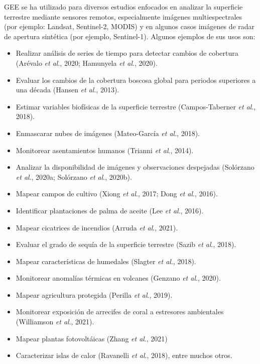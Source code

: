 \documentclass[
  12pt,
  letterpaper,
  twoside]{book}
\providecommand{\tightlist}{%
  \setlength{\itemsep}{0pt}\setlength{\parskip}{0pt}}
\begin{document}
GEE se ha utilizado para diversos estudios enfocados en analizar la superficie terrestre mediante sensores remotos, especialmente imágenes multiespectrales (por ejemplo: Landsat, Sentinel-2, MODIS) y en algunos casos imágenes de radar de apertura sintética (por ejemplo, Sentinel-1). Algunos ejemplos de sus usos son:

\begin{itemize}
\tightlist
\item
  Realizar análisis de series de tiempo para detectar cambios de cobertura (Arévalo \emph{et al}., 2020; Hamunyela \emph{et al}., 2020).
\item
  Evaluar los cambios de la cobertura boscosa global para periodos superiores a una década (Hansen \emph{et al}., 2013).
\item
  Estimar variables biofísicas de la superficie terrestre (Campos-Taberner \emph{et al}., 2018).
\item
  Enmascarar nubes de imágenes (Mateo-García \emph{et al}., 2018).
\item
  Monitorear asentamientos humanos (Trianni \emph{et al}., 2014).
\item
  Analizar la disponibilidad de imágenes y observaciones despejadas (Solórzano \emph{et al}., 2020a; Solórzano \emph{et al}., 2020b).
\item
  Mapear campos de cultivo (Xiong \emph{et al}., 2017; Dong \emph{et al}., 2016).
\item
  Identificar plantaciones de palma de aceite (Lee \emph{et al}., 2016).
\item
  Mapear cicatrices de incendios (Arruda \emph{et al}., 2021).
\item
  Evaluar el grado de sequía de la superficie terrestre (Sazib \emph{et al}., 2018).
\item
  Mapear características de humedales (Slagter \emph{et al}., 2018).
\item
  Monitorear anomalías térmicas en volcanes (Genzano \emph{et al}., 2020).
\item
  Mapear agricultura protegida (Perilla \emph{et al}., 2019).
\item
  Monitorear exposición de arrecifes de coral a estresores ambientales (Williamson \emph{et al}., 2021).
\item
  Mapear plantas fotovoltáicas (Zhang \emph{et al}., 2021)
\item
  Caracterizar islas de calor (Ravanelli \emph{et al}., 2018), entre muchos otros.
\end{itemize}
\end{document}
